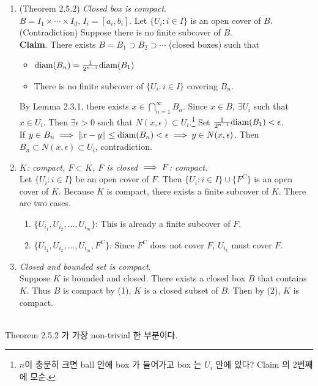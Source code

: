 \begin{enumerate}
	\item (Theorem 2.5.2) \textit{Closed box is compact}. \\
	$B = I_1\times\cdots\times I_d$, $I_i = [a_i, b_i]$. Let $\{U_i: i\in I \}$ is an open cover of $B$. \\
	(Contradiction) Suppose there is no finite subcover of $B$.\\
	\textbf{Claim}. There exists $B = B_1 \supset B_2\supset \cdots$ (closed boxes) such that
	\begin{itemize}
		\item $\text{diam} (B_n) = \frac{1}{2^{n-1}}\text{diam}(B_1)$
		\item There is no finite subcover of $\{U_i:i\in I \}$ covering $B_n$.
	\end{itemize}
	By Lemma 2.3.1, there exists $x\in \bigcap_{n=1}^\infty B_n$. Since $x\in B$, $\exists U_i$ such that $x\in U_i$. Then $\exists \epsilon>0$ such that $N(x, \epsilon) \subset U_i$.\footnote{$n$이 충분히 크면 ball 안에 box 가 들어가고 box 는 $U_i$ 안에 있다? Claim 의 2번째에 모순.} Set $\frac{1}{2^{n-1}}\text{diam} (B_1)<\epsilon$. \\
	If $y\in B_n \implies \left\lVert x-y\right\rVert \leq \text{diam}(B_n)<\epsilon\implies y\in N(x, \epsilon)$. Then $B_n \subset N(x , \epsilon)\subset U_i$, contradiction.
	
	\item \textit{$K$: compact, $F\subset K$, $F$ is closed $\implies F$: compact.}\\
	Let $\{U_i: i\in I\}$ be an open cover of $F$. Then $\{U_i: i\in I \} \cup \{F^C\}$ is an open cover of $K$. Because $K$ is compact, there exists a finite subcover of $K$. There are two cases.
	\begin{enumerate}
		\item $ \{U_{i_1}, U_{i_2}, \dots, U_{i_m} \} $:
		This is already a finite subcover of $F$.
		\item $ \{U_{i_1}, U_{i_2}, \dots, U_{i_m}, F^C \} $:
		Since $F^C$ does not cover $F$, $U_{i_k}$ must cover $F$.
	\end{enumerate}
	\item \textit{Closed and bounded set is compact}.\\
	Suppose $K$ is bounded and closed. There exists a closed box $B$ that contains $K$. Thus $B$ is compact by (1), $K$ is a closed subset of $B$. Then by (2), $K$ is compact.
\end{enumerate}~\\
Theorem 2.5.2 가 가장 non-trivial 한 부분이다.\\

